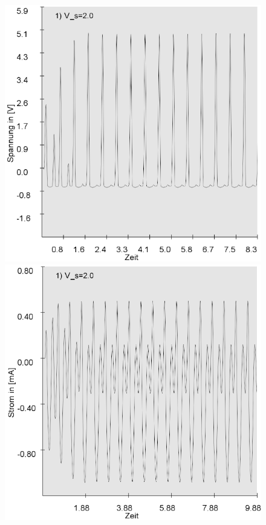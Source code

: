 \documentclass{scrartcl}
\begin{document}
\begin{figure}
\includegraphics[scale=0.28]{V_s-2V_spannung}
\includegraphics[scale=0.28]{V_s-2V_strom}

\end{figure}
\end{document}
